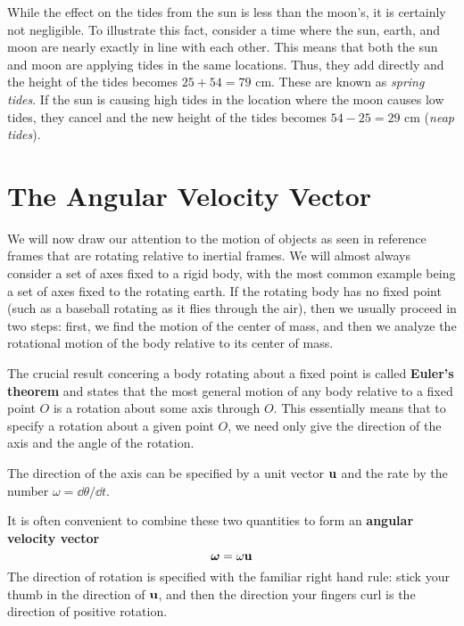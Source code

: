 While the effect on the tides from the sun is less than the moon's, it is certainly not negligible. To illustrate this fact, consider a time where the sun, earth, and moon are nearly exactly in line with each other. This means that both the sun and moon are applying tides in the same locations. Thus, they add directly and the height of the tides becomes $25+54=79$ cm. These are known as \textit{spring tides}. If the sun is causing high tides in the location where the moon causes low tides, they cancel and the new height of the tides becomes $54-25 = 29$ cm (\textit{neap tides}). 
\section{The Angular Velocity Vector}
We will now draw our attention to the motion of objects as seen in reference frames that are rotating relative to inertial frames. We will almost always consider a set of axes fixed to a rigid body, with the most common example being a set of axes fixed to the rotating earth. If the rotating body has no fixed point (such as a baseball rotating as it flies through the air), then we usually proceed in two steps: first, we find the motion of the center of mass, and then we analyze the rotational motion of the body relative to its center of mass. 

The crucial result concering a body rotating about a fixed point is called \textbf{Euler's theorem} and states that the most general motion of any body relative to a fixed point $O$ is a rotation about some axis through $O$. This essentially means that to specify a rotation about a given point $O$, we need only give the direction of the axis and the angle of the rotation. 

The direction of the axis can be specified by a unit vector $\mathbf{u}$ and the rate by the number $\omega = \dd\theta/\dd t$. 

It is often convenient to combine these two quantities to form an \textbf{angular velocity vector}
\[ \boldsymbol{\omega} = \omega\mathbf{u}\]
The direction of rotation is specified with the familiar right hand rule: stick your thumb in the direction of $\mathbf{u}$, and then the direction your fingers curl is the direction of positive rotation. 
